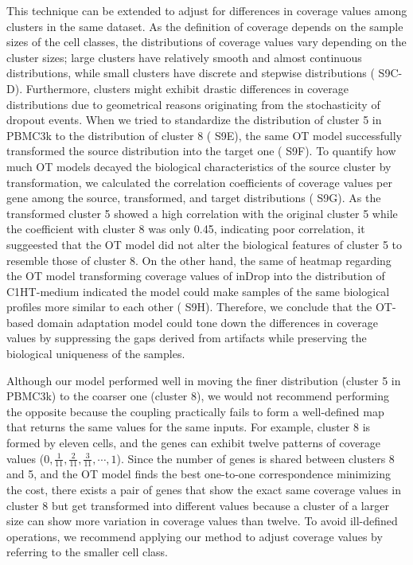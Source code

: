 \documentclass{article}
\begin{document}
This technique can be extended to adjust for differences in coverage values among clusters in the same dataset. 
As the definition of coverage depends on the sample sizes of the cell classes, the distributions of coverage values 
vary depending on the cluster sizes; large clusters have relatively smooth and almost continuous distributions, 
while small clusters have discrete and stepwise distributions (\figurename{ S9C-D}). Furthermore, clusters might exhibit 
drastic differences in coverage distributions due to geometrical reasons originating from the stochasticity of dropout 
events. When we tried to standardize the distribution of cluster 5 in PBMC3k to the distribution of cluster 8 (\figurename{ S9E}), 
the same OT model successfully transformed the source distribution into the target one (\figurename{ S9F}). To quantify 
how much OT models decayed the biological characteristics of the source cluster by transformation, we calculated 
the correlation coefficients of coverage values per gene among the source, transformed, and target distributions 
(\figurename{ S9G}). As the transformed cluster 5 showed a high correlation with the original cluster 5 while the coefficient with 
cluster 8 was only 0.45, indicating poor correlation, it suggeested that the OT model did not alter the biological 
features of cluster 5 to resemble those of cluster 8. On the other hand, the same of heatmap regarding the OT 
model transforming coverage values of inDrop into the distribution of C1HT-medium indicated the model could 
make samples of the same biological profiles more similar to each other (\figurename{ S9H}). Therefore, we conclude that 
the OT-based domain adaptation model could tone down the differences in coverage values by suppressing the gaps 
derived from artifacts while preserving the biological uniqueness of the samples.

Although our model performed well in moving the finer distribution (cluster 5 in PBMC3k) to the coarser one 
(cluster 8), we would not recommend performing the opposite because the coupling practically fails to form a well-defined 
map that returns the same values for the same inputs. For example, cluster 8 is formed by eleven cells, and 
the genes can exhibit twelve patterns of coverage values ($0,\frac{1}{11},\frac{2}{11},\frac{3}{11},\cdots,1$). Since the number of genes is shared 
between clusters 8 and 5, and the OT model finds the best one-to-one correspondence minimizing the cost, 
there exists a pair of genes that show the exact same coverage values in cluster 8 but get transformed into different 
values because a cluster of a larger size can show more variation in coverage values than twelve. To avoid ill-defined 
operations, we recommend applying our method to adjust coverage values by referring to the smaller cell class. 
\end{document}
